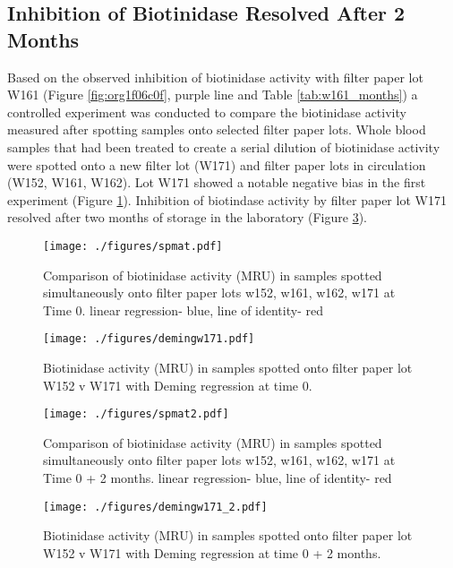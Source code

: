\documentclass[review]{elsarticle}
\begin{document}
\subsection*{Inhibition of Biotinidase Resolved After 2 Months}
\label{sec:orgf719cd1}
Based on the observed inhibition of biotinidase activity with filter
paper lot W161 (Figure \ref{fig:org1f06c0f}, purple line and Table
\ref{tab:w161_months}) a controlled experiment was conducted to
compare the biotinidase activity measured after spotting samples onto
selected filter paper lots. Whole blood samples that had been treated
to create a serial dilution of biotinidase activity were spotted onto
a new filter lot (W171) and filter paper lots in circulation (W152,
W161, W162). Lot W171 showed a notable negative bias in the first experiment (Figure
\ref{fig:org961c601}). Inhibition of biotindase activity by filter paper lot W171
resolved after two months of storage in the laboratory (Figure
\ref{fig:org3733286}).

\begin{figure}[htbp]
\centering
\texttt{[image: ./figures/spmat.pdf]}
\caption{\label{fig:org961c601}Comparison of biotinidase activity (MRU) in samples spotted simultaneously onto filter paper lots w152, w161, w162, w171 at Time 0. linear regression- blue, line of identity- red}
\end{figure}

\begin{figure}[htbp]
\centering
\texttt{[image: ./figures/demingw171.pdf]}
\caption{\label{fig:orgc95405a}Biotinidase activity (MRU) in samples spotted onto filter paper lot W152 v W171 with Deming regression at time 0.}
\end{figure}
\clearpage

\begin{figure}[htbp]
\centering
\texttt{[image: ./figures/spmat2.pdf]}
\caption{\label{fig:org3733286}Comparison of biotinidase activity (MRU) in samples spotted simultaneously onto filter paper lots w152, w161, w162, w171 at Time 0 + 2 months. linear regression- blue, line of identity- red}
\end{figure}

\begin{figure}[htbp]
\centering
\texttt{[image: ./figures/demingw171\_2.pdf]}
\caption{\label{fig:orgd153362}Biotinidase activity (MRU) in samples spotted onto filter paper lot W152 v W171 with Deming regression at time 0 + 2 months.}
\end{figure}
\end{document}
